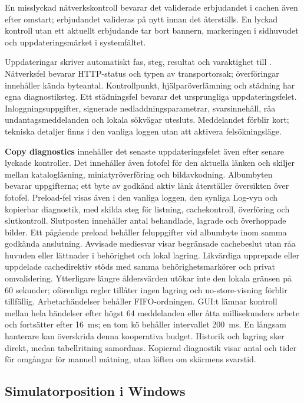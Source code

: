 \documentclass[11pt,a4paper]{article}
\newcommand{\ui}[1]{\textbf{#1}}
\begin{document}
En misslyckad nätverkskontroll bevarar det validerade erbjudandet i cachen även
efter omstart; erbjudandet valideras på nytt innan det återställs. En lyckad
kontroll utan ett aktuellt erbjudande tar bort bannern, markeringen i sidhuvudet
och uppdateringsmärket i systemfältet.

Uppdateringar skriver automatiskt fas, steg, resultat och varaktighet till
. Nätverksfel bevarar HTTP-status och typen av transportorsak;
överföringar innehåller kända byteantal. Kontrollpunkt, hjälparöverlämning och
städning har egna diagnostiksteg. Ett städningsfel bevarar det ursprungliga
uppdateringsfelet. Inloggningsuppgifter, signerade nedladdningsparametrar,
svarsinnehåll, råa undantagsmeddelanden och lokala sökvägar utesluts.
Meddelandet förblir kort; tekniska detaljer finns i den vanliga loggen utan
att aktivera felsökningsläge.

\ui{Copy diagnostics} innehåller det senaste uppdateringsfelet även efter
senare lyckade kontroller. Det innehåller även fotofel för den aktuella länken
och skiljer mellan katalogläsning, miniatyröverföring och bildavkodning.
Albumbyten bevarar uppgifterna; ett byte av godkänd aktiv länk återställer
översikten över fotofel.
Preload-fel visas även i den vanliga loggen, den synliga Log-vyn och kopierbar
diagnostik, med skilda steg för listning, cachekontroll, överföring och
slutkontroll. Slutposten innehåller antal behandlade, lagrade och överhoppade
bilder. Ett pågående preload behåller feluppgifter vid albumbyte inom samma
godkända anslutning. Avvisade mediesvar visar begränsade cachebeslut utan råa
huvuden eller lättnader i behörighet och lokal lagring.
Likvärdiga upprepade eller uppdelade cachedirektiv stöds med samma
behörighetsmarkörer och privat omvalidering. Ytterligare längre åldersvärden
utökar inte den lokala gränsen på 60 sekunder; oförenliga regler tillåter
ingen lagring och no-store-visning förblir tillfällig.
Arbetarhändelser behåller FIFO-ordningen. GUI:t lämnar kontroll mellan hela
händelser efter högst 64 meddelanden eller åtta millisekunders arbete och
fortsätter efter 16~ms; en tom kö behåller intervallet 200~ms. En långsam
hanterare kan överskrida denna kooperativa budget. Historik och lagring sker
direkt, medan tabellritning samordnas. Kopierad diagnostik visar antal och
tider för omgångar för manuell mätning, utan löften om skärmens svarstid.

\subsection{Simulatorposition i Windows}
\end{document}
